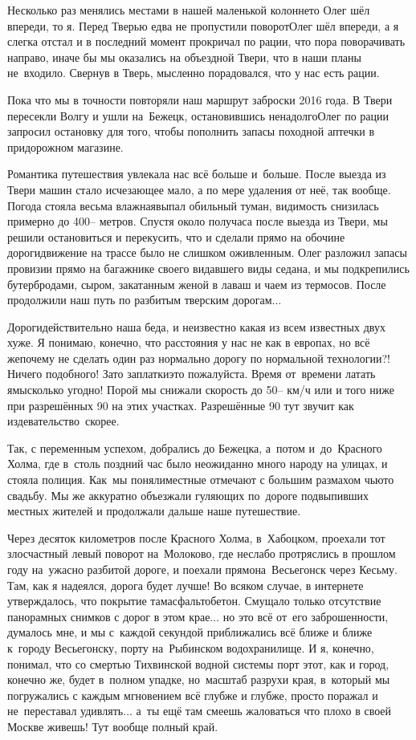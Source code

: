 Несколько раз менялись местами в нашей маленькой колонне\mdash то Олег шёл впереди, то я. Перед Тверью едва не пропустили поворот\mdash Олег шёл впереди, а я слегка отстал и в последний момент прокричал по рации, что пора поворачивать направо, иначе бы мы оказались на объездной Твери, что в наши планы не~входило. Свернув в Тверь, мысленно порадовался, что у нас есть рации.

Пока что мы в точности повторяли наш маршрут заброски 2016 года. В Твери пересекли Волгу и ушли на~Бежецк, остановившись ненадолго\mdash Олег по рации запросил остановку для того, чтобы пополнить запасы походной аптечки в придорожном магазине. 

Романтика путешествия увлекала нас всё больше и~больше. После выезда из Твери машин стало исчезающее мало, а по мере удаления от неё, так вообще. Погода стояла весьма влажная\mdash выпал обильный туман, видимость снизилась примерно до 400\thinspace\nobreakdash-- метров. Спустя около получаса после выезда из Твери, мы решили остановиться и перекусить, что и сделали прямо на обочине дороги\mdash движение на трассе было не слишком оживленным. Олег разложил запасы провизии прямо на багажнике своего видавшего виды седана, и мы подкрепились бутербродами, сыром, закатанным женой в лаваш и чаем из термосов. После продолжили наш путь по разбитым тверским дорогам$\ldots$

Дороги\mdash действительно наша беда, и неизвестно какая из всем известных двух хуже. Я понимаю, конечно, что расстояния у нас не как в европах, но всё же\mdash почему не сделать один раз нормально дорогу по нормальной технологии?! Ничего подобного! Зато заплатки\mdash это пожалуйста. Время от~времени латать ямы\mdash сколько угодно! Порой мы снижали скорость до 50\thinspace\nobreakdash-- км/ч или и того ниже при разрешённых 90 на этих участках. Разрешённые 90 тут звучит как издевательство~скорее. 

Так, с переменным успехом, добрались до Бежецка, а~потом и~до~Красного Холма, где в~столь поздний час было неожиданно много народу на улицах, и стояла полиция. Как~мы поняли\mdash местные отмечают с большим размахом чью\sdash то свадьбу. Мы же аккуратно объезжали гуляющих по~дороге подвыпивших местных жителей и продолжали дальше наше путешествие. 

Через десяток километров после Красного Холма, в~Хабоцком, проехали тот злосчастный левый поворот на~Молоково, где неслабо протряслись в прошлом году на~ужасно разбитой дороге, и поехали прямо\mdash на~Весьегонск через Кесьму. Там, как я надеялся, дорога будет лучше! Во всяком случае, в интернете утверждалось, что покрытие там\mdash асфальтобетон. Смущало только отсутствие панорамных снимков с дорог в этом крае$\ldots$ но это всё от~его заброшенности, думалось мне, и мы с~каждой секундой приближались всё ближе и ближе к~городу Весьегонску, порту на~Рыбинском водохранилище. И я, конечно, понимал, что со смертью Тихвинской водной системы порт этот, как и город, конечно же, будет в~полном упадке, но~масштаб разрухи края, в~который мы погружались с каждым мгновением всё глубже и глубже, просто поражал и не~переставал удивлять$\ldots$ а~ты ещё там смеешь жаловаться что плохо в своей Москве живешь! Тут вообще полный край. 

